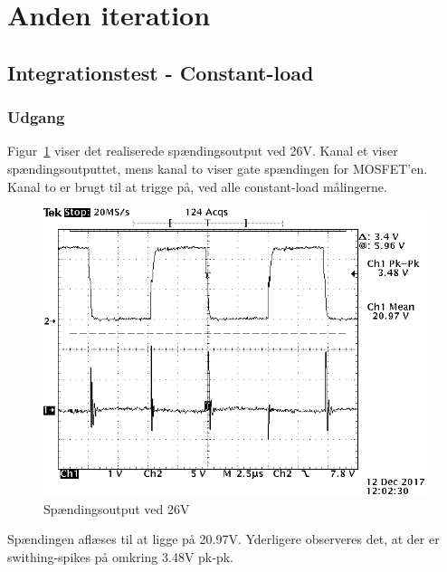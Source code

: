 \section{Anden iteration}

\subsection{Integrationstest - Constant-load}

\subsubsection{Udgang}
\noindent Figur~\ref{fig: Out26V} viser det realiserede spændingsoutput ved 26V. Kanal et viser spændingsoutputtet, mens kanal to viser gate spændingen for MOSFET'en. Kanal to er brugt til at trigge på, ved alle constant-load målingerne. 
\begin{figure}[H]
	\center
	\includegraphics[max width=0.7\linewidth]{../dokumentation/tex/2iteration/billeder/Realisering/udgang_f_filter_2iteration.png}
	\caption{Spændingsoutput ved 26V}
	\label{fig: Out26V}
\end{figure}
\noindent Spændingen aflæses til at ligge på 20.97V. Yderligere observeres det, at der er swithing-spikes på omkring 3.48V pk-pk.

